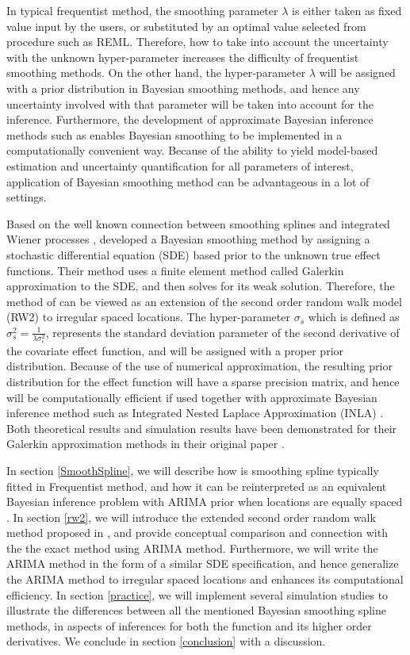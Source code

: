 \documentclass{article}
\begin{document}
In typical frequentist method, the smoothing parameter $\lambda$ is either taken as fixed value input by the users, or substituted by an optimal value selected from procedure such as REML. Therefore, how to take into account the uncertainty with the unknown hyper-parameter increases the difficulty of frequentist smoothing methods. On the other hand, the hyper-parameter $\lambda$ will be assigned with a prior distribution in Bayesian smoothing methods, and hence any uncertainty involved with that parameter will be taken into account for the inference. Furthermore, the development of approximate Bayesian inference methods such as \cite{inla} enables Bayesian smoothing to be implemented in a computationally convenient way. Because of the ability to yield model-based estimation and uncertainty quantification for all parameters of interest, application of Bayesian smoothing method can be advantageous in a lot of settings.


Based on the well known connection between smoothing splines and integrated Wiener processes \citep{wahba}, \cite{rw2} developed a Bayesian smoothing method by assigning a stochastic differential equation (SDE) based prior to the unknown true effect functions. 
Their method uses a finite element method called Galerkin approximation to the SDE, and then solves for its weak solution. Therefore, the method of \cite{inla} can be viewed as an extension of the second order random walk model (RW2) to irregular spaced locations.
The hyper-parameter $\sigma_s$ which is defined as $\sigma_s^2 = \frac{1}{ \lambda \sigma_\epsilon^2}$, represents the standard deviation parameter of the second derivative of the covariate effect function, and will be assigned with a proper prior distribution. Because of the use of numerical approximation, the resulting prior distribution for the effect function will have a sparse precision matrix, and hence will be computationally efficient if used together with approximate Bayesian inference method such as Integrated Nested Laplace Approximation (INLA) \citep{inla}. Both theoretical results and simulation results have been demonstrated for their Galerkin approximation methods in their original paper \citep{rw2}.


In section \ref{SmoothSpline}, we will describe how is smoothing spline typically fitted in Frequentist method, and how it can be reinterpreted as an equivalent Bayesian inference problem with ARIMA prior when locations are equally spaced \citep{ARIMA}. In section \ref{rw2}, we will introduce the extended second order random walk method proposed in \cite{rw2}, and provide conceptual comparison and connection with the the exact method using ARIMA method. Furthermore, we will write the ARIMA method in the form of a similar SDE specification, and hence generalize the ARIMA method to irregular spaced locations and enhances its computational efficiency. In section \ref{practice}, we will implement several simulation studies to illustrate the differences between all the mentioned Bayesian smoothing spline methods, in aspects of inferences for both the function and its higher order derivatives. We conclude in section \ref{conclusion} with a discussion.
\end{document}
